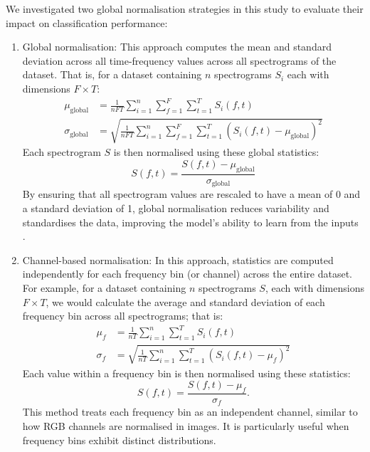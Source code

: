 We investigated two global normalisation strategies in this study to evaluate their impact on classification performance:
\begin{enumerate}
    \item Global normalisation: This approach computes the mean and standard deviation across all time-frequency values across all spectrograms of the dataset. That is, for a dataset containing $n$ spectrograms $S_i$ each with dimensions $F \times T$:
    \begin{align}
        \mu_\text{global} &= \frac{1}{nFT} \sum_{i=1}^n \sum_{f=1}^F \sum_{t=1}^T S_i(f, t)\\
        \sigma_\text{global} &= \sqrt{\frac{1}{nFT} \sum_{i=1}^n \sum_{f=1}^F \sum_{t=1}^T \left(S_i(f, t) - \mu_\text{global}\right)^2}
    \end{align} 
    Each spectrogram $S$ is then normalised using these global statistics:
    \begin{equation}
        S(f,t) = \frac{S(f,t) - \mu_{\text{global}}}{\sigma_{\text{global}}}
    \end{equation}
    By ensuring that all spectrogram values are rescaled to have a mean of 0 and a standard deviation of 1, global normalisation reduces variability and standardises the data, improving the model's ability to learn from the inputs \cite{chris_kroenke_normalizing_2022}.
    \item Channel-based normalisation: In this approach, statistics are computed independently for each frequency bin (or channel) across the entire dataset. For example, for a dataset containing $n$ spectrograms $S$, each with dimensions $F \times T$, we would calculate the average and standard deviation of each frequency bin across all spectrograms; that is:
    \begin{align}
        \mu_f &= \frac{1}{nT} \sum_{i=1}^n \sum_{t=1}^T S_i(f, t) \\
        \sigma_f &= \sqrt{\frac{1}{nT} \sum_{i=1}^n \sum_{t=1}^T \left(S_i(f, t) - \mu_f\right)^2}
    \end{align}
    Each value within a frequency bin is then normalised using these statistics:
    \begin{equation}
        S(f,t) = \frac{S(f,t) - \mu_f}{\sigma_f}.
    \end{equation}
    This method treats each frequency bin as an independent channel, similar to how RGB channels are normalised in images. It is particularly useful when frequency bins exhibit distinct distributions.
\end{enumerate}

